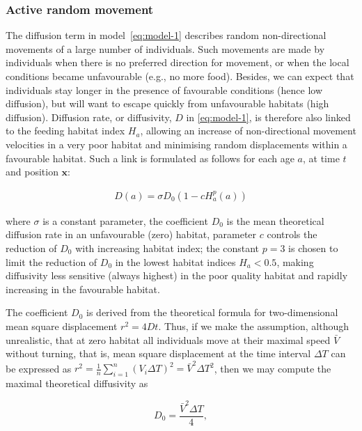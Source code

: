 \subsubsection{Active random movement}\label{sec:directed-movements}

The diffusion term in model~\eqref{eq:model-1} describes random non-directional movements of a large number of individuals. Such movements are made by individuals when there is no preferred direction for movement, or when the local conditions became unfavourable (e.g., no more food). Besides, we can expect that individuals stay longer in the presence of favourable conditions (hence low diffusion), but will want to escape quickly from unfavourable habitats (high diffusion). Diffusion rate, or diffusivity, $D$ in \eqref{eq:model-1}, is therefore also linked to the feeding habitat index $H_a$, allowing an increase of non-directional movement velocities in a very poor habitat and minimising random displacements within a favourable habitat. Such a link is formulated as follows for each age $a$, at time $t$ and position $\mathbf{x}$:

\begin{align}
	D(a) = \sigma D_0 \left( 1-c{H^p_a}(a)\right) 
\label{eq:diffusion}	
\end{align}

\noindent where $\sigma$ is a constant parameter, the coefficient $D_0$ is the mean theoretical diffusion rate in an unfavourable (zero) habitat, parameter $c$ controls the reduction of $D_0$ with increasing habitat index; the constant $p=3$ is chosen to limit the reduction of $D_0$ in the lowest habitat indices $H_a<0.5$, making diffusivity less sensitive (always highest) in the poor quality habitat and rapidly increasing in the favourable habitat. 

The coefficient $D_0$ is derived from the theoretical formula for two-dimensional mean square displacement $r^2=4Dt$. Thus, if we make the assumption, although unrealistic, that at zero habitat all individuals move at their maximal speed $\bar{V}$ without turning, that is, mean square displacement at the time interval $\Delta T$ can be expressed as $r^2=\frac{1}{n}\sum\limits^n_{i=1}{(V_i \Delta T)^2}={\bar{V}}^2 {\Delta T}^2$, then we may compute the maximal theoretical diffusivity as

\begin{equation}
D_0=\frac{{\bar{V}}^2 \Delta T}{4},
\label{eq:theoretical-diffusivity}
\end{equation}

